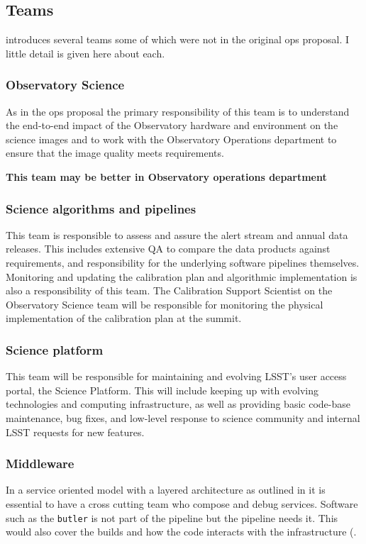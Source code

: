 
\subsection{Teams }\label{sec:teams}
 introduces several teams some of which were not in the original ops proposal. I  little detail is given here about each.

\subsubsection{Observatory Science}
As in the ops proposal the primary responsibility of this team is to understand the end-to-end impact of the Observatory hardware and environment on the science images and to work with the Observatory Operations department to ensure that the image quality meets requirements.

\textbf{This team may be better  in Observatory operations department }

\subsubsection{Science algorithms and pipelines}
This team is responsible to assess and assure the alert stream and annual data releases. This includes extensive QA to compare the data products against requirements, and responsibility for the underlying software pipelines themselves. Monitoring and updating the calibration plan and algorithmic implementation is also a responsibility of this team. The Calibration Support Scientist on the Observatory Science team will be responsible for monitoring the physical implementation of the calibration plan at the summit.

\subsubsection{Science platform  }
This team will be responsible for maintaining and evolving LSST’s user access portal, the Science Platform. This will include keeping up with evolving technologies and computing infrastructure, as well as providing basic code-base maintenance, bug fixes, and low-level response to science community and internal LSST requests for new features.

\subsubsection{Middleware }
In a service oriented model with a layered architecture as outlined in  it is essential to have a cross cutting team who compose and debug services.
Software such as the \texttt{butler}  is not part of the pipeline but the pipeline needs it.
This would also cover the builds and how the code interacts with the infrastructure (.

